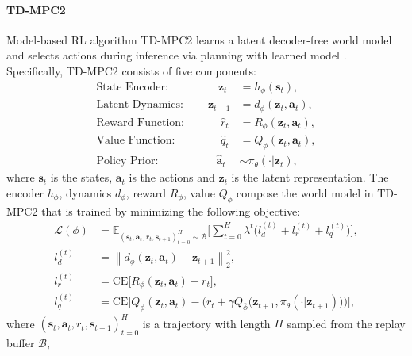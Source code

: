 \paragraph{TD-MPC2} Model-based RL algorithm TD-MPC2 learns a latent decoder-free world model and selects actions during inference via planning with learned model \citep{hansen2023td}. 
Specifically, TD-MPC2 consists of five components:
\begin{align}
    \nonumber\text{State Encoder:}\qquad\qquad\;\:\mathbf{z}_t &= h_{\phi}\left(\mathbf{s}_t\right), \\
    \nonumber\text{Latent Dynamics:}\qquad\:\mathbf{z}_{t+1} &= d_{\phi}\left(\mathbf{z}_t, \mathbf{a}_t\right), \\
    \nonumber\text{Reward Function:}\qquad\quad \;\hat{r}_t &= R_{\phi}\left(\mathbf{z}_t, \mathbf{a}_t\right), \\
    \nonumber\text{Value Function:}\qquad\quad\enspace\:\: \,\hat{q}_t &= Q_{\phi}\left(\mathbf{z}_t, \mathbf{a}_t\right), \\
    \nonumber\text{Policy Prior:}\qquad\qquad\quad\:\hat{\mathbf{a}}_t &\sim \pi_{\theta}\left(\cdot|\mathbf{z}_t\right),
\end{align}
where $\mathbf{s}_t$ is the states, $\mathbf{a}_t$ is the actions and $\mathbf{z}_t$ is the latent representation. The encoder $h_{\phi}$, dynamics $d_{\phi}$, reward $R_{\phi}$, value $Q_{\phi}$ compose the world model in TD-MPC2 that is trained by minimizing the following objective: 
\begin{align}
    \nonumber \mathcal{L}\left(\phi\right) &= \mathbb{E}_{\left(\mathbf{s}_t, \mathbf{a}_t, r_t, \mathbf{s}_{t+1}\right)_{t=0}^{H} \sim \mathcal{B}}
    \Bigg[\sum_{t=0}^{H}\lambda^t\Big(l^{\left(t\right)}_d+l^{\left(t\right)}_r+l^{\left(t\right)}_q\Big)\Bigg], \\ 
    \nonumber l^{\left(t\right)}_d &= \left\|d_{\phi}\left(\mathbf{z}_t, \mathbf{a}_t\right) - \bar{\mathbf{z}}_{t+1}\right\|_2^2,  \\ 
    \nonumber l^{\left(t\right)}_r &= \text{CE}\Big[R_{\phi}\left(\mathbf{z}_t, \mathbf{a}_t\right) - r_t\Big], \\ 
    \nonumber l^{\left(t\right)}_q &= \text{CE}\bigg[Q_{\phi}\left(\mathbf{z}_t, \mathbf{a}_t\right)-\Big(r_t + \gamma Q_{\bar{\phi}}\big(\mathbf{z}_{t+1}, \pi_{\theta}\left(\cdot|\mathbf{z}_{t+1}\right)\big) \Big)\bigg],
\end{align}
where $\left(\mathbf{s}_t, \mathbf{a}_t, r_t, \mathbf{s}_{t+1}\right)_{t=0}^{H}$ is a trajectory with length $H$ sampled from the replay buffer $\mathcal{B}$, 
